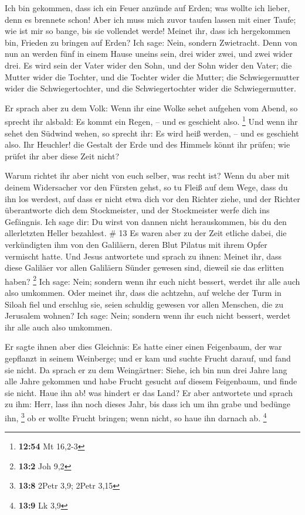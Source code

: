  Ich bin gekommen, dass ich ein Feuer anzünde auf Erden;
was wollte ich lieber, denn es brennete schon!  Aber ich
muss mich zuvor taufen lassen mit einer Taufe; wie ist mir so bange, bis
sie vollendet werde!  Meinet ihr, dass ich hergekommen bin,
Frieden zu bringen auf Erden? Ich sage: Nein, sondern Zwietracht.
 Denn von nun an werden fünf in einem Hause uneins sein,
drei wider zwei, und zwei wider drei.  Es wird sein der
Vater wider den Sohn, und der Sohn wider den Vater; die Mutter wider die
Tochter, und die Tochter wider die Mutter; die Schwiegermutter wider die
Schwiegertochter, und die Schwiegertochter wider die Schwiegermutter.

 Er sprach aber zu dem Volk: Wenn ihr eine Wolke sehet
aufgehen vom Abend, so sprecht ihr alsbald: Es kommt ein Regen, -- und
es geschieht also. \footnote{\textbf{12:54} Mt 16,2-3}  Und
wenn ihr sehet den Südwind wehen, so sprecht ihr: Es wird heiß werden,
-- und es geschieht also.  Ihr Heuchler! die Gestalt der
Erde und des Himmels könnt ihr prüfen; wie prüfet ihr aber diese Zeit
nicht?

 Warum richtet ihr aber nicht von euch selber, was recht
ist?  Wenn du aber mit deinem Widersacher vor den Fürsten
gehst, so tu Fleiß auf dem Wege, dass du ihn los werdest, auf dass er
nicht etwa dich vor den Richter ziehe, und der Richter überantworte dich
dem Stockmeister, und der Stockmeister werfe dich ins Gefängnis.
 Ich sage dir: Du wirst von dannen nicht herauskommen, bis
du den allerletzten Heller bezahlest. \# 13  Es waren aber
zu der Zeit etliche dabei, die verkündigten ihm von den Galiläern, deren
Blut Pilatus mit ihrem Opfer vermischt hatte.  Und Jesus
antwortete und sprach zu ihnen: Meinet ihr, dass diese Galiläer vor
allen Galiläern Sünder gewesen sind, dieweil sie das erlitten haben?
\footnote{\textbf{13:2} Joh 9,2}  Ich sage: Nein; sondern
wenn ihr euch nicht bessert, werdet ihr alle auch also umkommen.
 Oder meinet ihr, dass die achtzehn, auf welche der Turm in
Siloah fiel und erschlug sie, seien schuldig gewesen vor allen Menschen,
die zu Jerusalem wohnen?  Ich sage: Nein; sondern wenn ihr
euch nicht bessert, werdet ihr alle auch also umkommen.

 Er sagte ihnen aber dies Gleichnis: Es hatte einer einen
Feigenbaum, der war gepflanzt in seinem Weinberge; und er kam und suchte
Frucht darauf, und fand sie nicht.  Da sprach er zu dem
Weingärtner: Siehe, ich bin nun drei Jahre lang alle Jahre gekommen und
habe Frucht gesucht auf diesem Feigenbaum, und finde sie nicht. Haue ihn
ab! was hindert er das Land?  Er aber antwortete und sprach
zu ihm: Herr, lass ihn noch dieses Jahr, bis dass ich um ihn grabe und
bedünge ihn, \footnote{\textbf{13:8} 2Petr 3,9; 2Petr 3,15} 
ob er wollte Frucht bringen; wenn nicht, so haue ihn darnach ab.
\footnote{\textbf{13:9} Lk 3,9}

